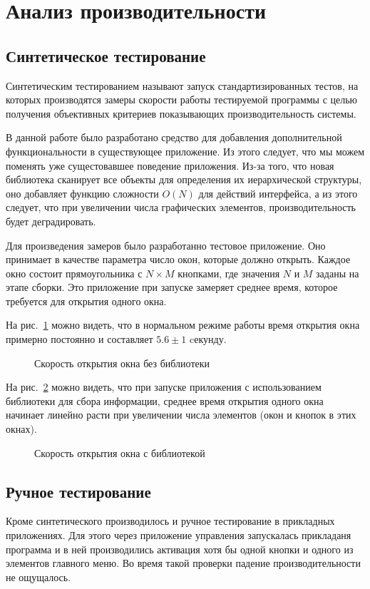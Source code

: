 \section{Анализ производительности}

\subsection{Синтетическое тестирование}

Синтетическим тестированием называют запуск стандартизированных тестов,
на которых производятся замеры скорости работы тестируемой программы с целью
получения объективных критериев показывающих производительность системы.

В данной работе было разработано средство для добавления дополнительной
функциональности в существующее приложение. Из этого следует, что мы можем
поменять уже сущестовавшее поведение приложения. Из-за того, что новая
библиотека сканирует все объекты для определения их иерархической структуры, оно
добавляет функцию сложности $O(N)$ для действий интерфейса, а из этого следует,
что при увеличении числа графических элементов, производительность будет
деградировать.

Для произведения замеров было разработанно тестовое приложение. Оно принимает в
качестве параметра число окон, которые должно открыть. Каждое окно состоит
прямоугольника с $N \times M$ кнопками, где значения $N$ и $M$ заданы на этапе
сборки. Это приложение при запуске замеряет среднее время, которое требуется
для открытия одного окна.

На рис.~\ref{normal-perf} можно видеть, что в нормальном режиме работы
время открытия окна примерно постоянно и составляет $5.6\pm1$ cекунду.

\begin{figure}[h]
	\centering
	
	\caption{Скорость открытия окна без библиотеки}\label{normal-perf}
\end{figure}

На рис.~\ref{lib-perf} можно видеть, что при запуске приложения с использованием
библиотеки для сбора информации, среднее время открытия одного окна начинает
линейно расти при увеличении числа элементов (окон и кнопок в этих окнах).

\begin{figure}[h]
	\centering
	
	\caption{Скорость открытия окна с библиотекой}\label{lib-perf}
\end{figure}

\subsection{Ручное тестирование}

Кроме синтетического производилось и ручное тестирование в прикладных
приложениях. Для этого через приложение управления запускалась прикладаня
программа и в ней производились активация хотя бы одной кнопки и одного из
элементов главного меню.  Во время такой проверки падение производительности не
ощущалось.
